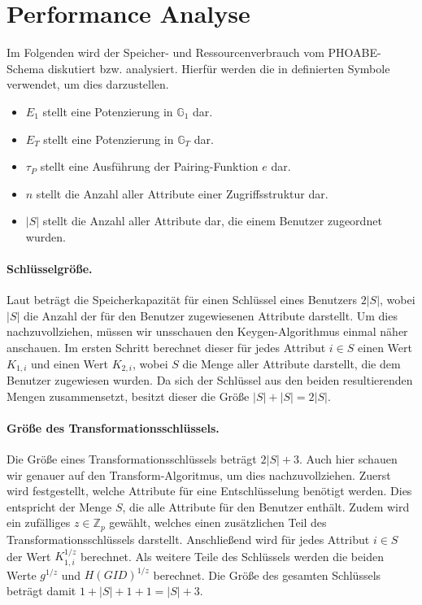 \newcommand{\sizeof}[1]{\small\texttt{size}\left( #1 \right)}
\renewcommand{\O}[1]{\mathcal{O} \left( #1 \right)}

\newpage
\section{Performance Analyse}
Im Folgenden wird der Speicher- und Ressourcenverbrauch vom PHOABE-Schema
diskutiert bzw. analysiert. Hierfür werden die in \cite{phoabe} definierten
Symbole verwendet, um dies darzustellen.

\begin{itemize}
  \item $E_1$ stellt eine Potenzierung in $\mathbb{G}_1$ dar.
  \item $E_T$ stellt eine Potenzierung in $\mathbb{G}_T$ dar.
  \item $\tau_P$ stellt eine Ausführung der Pairing-Funktion $e$ dar.
  \item $n$ stellt die Anzahl aller Attribute einer Zugriffsstruktur dar.
  \item $\lvert S \rvert$ stellt die Anzahl aller Attribute dar, die einem
    Benutzer zugeordnet wurden.
\end{itemize}

\paragraph{Schlüsselgröße.}
Laut \cite{phoabe} beträgt die Speicherkapazität für einen Schlüssel eines
Benutzers $2 \lvert S \rvert$, wobei $\lvert S \rvert$ die Anzahl der für
den Benutzer zugewiesenen Attribute darstellt. Um dies nachzuvollziehen, müssen
wir unsschauen den Keygen-Algorithmus einmal näher anschauen. Im ersten Schritt
berechnet dieser für jedes Attribut $i \in S$ einen Wert $K_{1,i}$ und einen Wert
$K_{2,i}$, wobei $S$ die Menge aller Attribute darstellt, die dem Benutzer
zugewiesen wurden. Da sich der Schlüssel aus den beiden resultierenden Mengen
zusammensetzt, besitzt dieser die Größe $\lvert S \rvert + \lvert S \rvert = 2
\lvert S \rvert$.

\paragraph{Größe des Transformationsschlüssels.}
Die Größe eines Transformationsschlüssels beträgt $2 \lvert S \rvert + 3$. Auch
hier schauen wir genauer auf den Transform-Algoritmus, um dies nachzuvollziehen.
Zuerst wird festgestellt, welche Attribute für eine Entschlüsselung benötigt
werden. Dies entspricht der Menge $S$, die alle Attribute für den Benutzer
enthält. Zudem wird ein zufälliges $z \in \mathbb{Z}_p$ gewählt, welches
einen zusätzlichen Teil des Transformationsschlüssels darstellt. Anschließend
wird für jedes Attribut $i \in S$ der Wert $K_{1,i}^{1/z}$ berechnet. Als
weitere Teile des Schlüssels werden die beiden Werte $g^{1/z}$ und
$H(GID)^{1/z}$ berechnet. Die Größe des gesamten Schlüssels beträgt damit $1 +
\lvert S \rvert + 1 + 1 = \lvert S \rvert + 3$.

